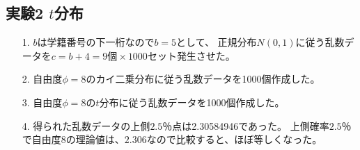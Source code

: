 \documentclass[12pt]{jarticle}
\begin{document}
\subsection{実験2 $t$分布}
\begin{itemize}
    \item [1.]$b$は学籍番号の下一桁なので$b=5$として、
          正規分布$N(0,1)$に従う乱数データを$c=b+4=9個\times 1000セット$発生させた。
    \item [2.]自由度$\phi=8$のカイ二乗分布に従う乱数データを1000個作成した。
    \item [3.]自由度$\phi=8$の$t$分布に従う乱数データを1000個作成した。
    \item [4.]得られた乱数データの上側$2.5％$点は2.30584946であった。
          上側確率$2.5％$で自由度$8$の理論値は、$2.306$なので比較すると、ほぼ等しくなった。
\end{itemize}
\end{document}
